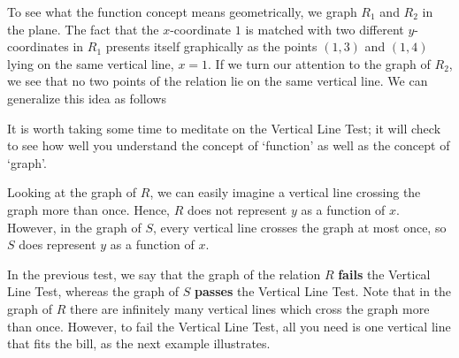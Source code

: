 



To see what the function concept means geometrically, we graph $R_{1}$ and $R_{2}$ in the plane.
The fact that the $x$-coordinate $1$ is matched with two different $y$-coordinates in $R_{1}$ presents itself graphically as the points $(1,3)$ and $(1,4)$ lying on the same vertical line, $x=1$.  If we turn our attention to the graph of $R_{2}$, we see that no two points of the relation lie on the same vertical line.  We can generalize this idea as follows

\smallskip


\smallskip


It is worth taking some time to meditate on the Vertical Line Test; it will check to see how well you understand the concept of `function' as well as the concept of `graph'.

\pagebreak

{
Looking at the graph of $R$, we can easily imagine a vertical line crossing the graph more than once.  Hence, $R$ does not represent $y$ as a function of $x$.  However, in the graph of $S$, every vertical line crosses the graph at most once, so $S$ does represent $y$ as a function of $x$. 
}


\medskip

In the previous test, we say that the graph of the relation $R$ \textbf{fails} the Vertical Line Test, whereas the graph of $S$ \textbf{passes} the Vertical Line Test.  Note that in the graph of $R$ there are infinitely many vertical lines which cross the graph more than once. However, to fail the Vertical Line Test, all you need is one vertical line that fits the bill, as the next example illustrates.


